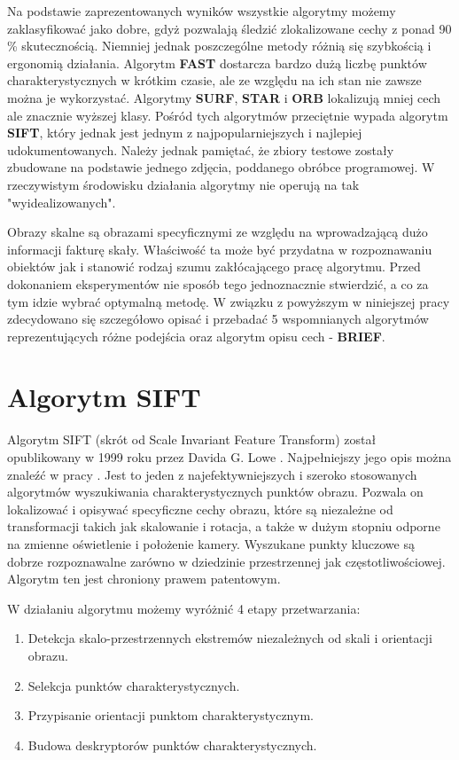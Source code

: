 \newpage


Na podstawie zaprezentowanych wyników wszystkie algorytmy możemy zaklasyfikować jako dobre, gdyż pozwalają śledzić zlokalizowane cechy z ponad 90 \% skutecznością. Niemniej jednak poszczególne metody różnią się szybkością i ergonomią działania. Algorytm \textbf{FAST} dostarcza bardzo dużą liczbę punktów charakterystycznych w krótkim czasie, ale ze względu na ich stan nie zawsze można je wykorzystać. Algorytmy \textbf{SURF}, \textbf{STAR} i \textbf{ORB} lokalizują mniej cech ale znacznie wyższej klasy. Pośród tych algorytmów przeciętnie wypada algorytm \textbf{SIFT}, który jednak jest jednym z najpopularniejszych i najlepiej udokumentowanych. Należy jednak pamiętać, że zbiory testowe zostały zbudowane na podstawie jednego zdjęcia, poddanego obróbce programowej. W rzeczywistym środowisku działania algorytmy nie operują na tak "wyidealizowanych". 

Obrazy skalne są obrazami specyficznymi ze względu na wprowadzającą dużo informacji fakturę skały. Właściwość ta może być przydatna w rozpoznawaniu obiektów jak i stanowić rodzaj szumu zakłócającego pracę algorytmu. Przed dokonaniem eksperymentów nie sposób tego jednoznacznie stwierdzić, a co za tym idzie wybrać optymalną metodę. W związku z powyższym w niniejszej pracy zdecydowano się szczegółowo opisać i przebadać 5 wspomnianych algorytmów reprezentujących różne podejścia oraz algorytm opisu cech - \textbf{BRIEF}.




\newpage
\section{Algorytm SIFT}
Algorytm SIFT (skrót od Scale Invariant Feature Transform) został opublikowany w 1999 roku przez Davida G. Lowe \cite{DGL99}. Najpełniejszy jego opis można znaleźć w pracy \cite{DGL04}.  Jest to jeden z najefektywniejszych i szeroko stosowanych algorytmów wyszukiwania charakterystycznych punktów obrazu. Pozwala on lokalizować i opisywać specyficzne cechy obrazu, które są niezależne od transformacji takich jak skalowanie i rotacja, a także w dużym stopniu odporne na zmienne oświetlenie i położenie kamery. Wyszukane punkty kluczowe są dobrze rozpoznawalne zarówno w dziedzinie przestrzennej jak częstotliwościowej. Algorytm ten jest chroniony prawem patentowym.

W działaniu algorytmu możemy wyróżnić 4 etapy przetwarzania:
\begin{enumerate}
\item Detekcja skalo-przestrzennych ekstremów niezależnych od skali i orientacji obrazu.
\item Selekcja punktów charakterystycznych.
\item Przypisanie orientacji punktom charakterystycznym.
\item Budowa deskryptorów punktów charakterystycznych.
\end{enumerate}
